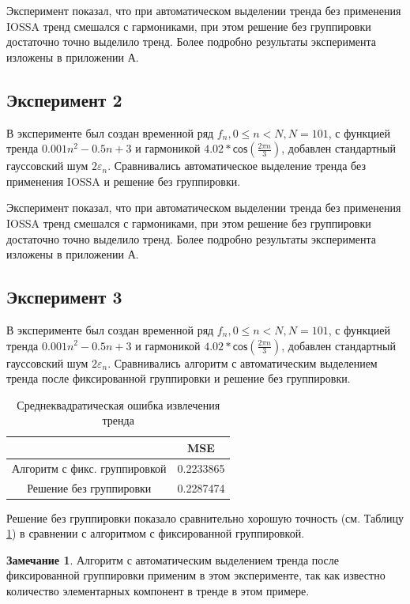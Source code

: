 \documentclass[specialist,
               substylefile = spbu_report.rtx,
               subf,href,colorlinks=true, 12pt]{disser}
\theoremstyle{definition}
\newtheorem{remark}{Замечание}
\begin{document}
Эксперимент показал, что при автоматическом выделении тренда без применения IOSSA тренд смешался с гармониками, при этом решение без группировки достаточно точно выделило тренд. Более подробно результаты эксперимента изложены в приложении А.

\subsection{Эксперимент 2}
В эксперименте был создан временной ряд $f_n , 0\leq n < N, N=101$, с функцией тренда $0.001n^2-0.5n+3$ и гармоникой $4.02 * \mathsf{cos}(\frac{2\pi n}{3})$, добавлен стандартный гауссовский шум $2 \varepsilon_n$.
Сравнивались автоматическое выделение тренда без применения IOSSA и решение без группировки.

Эксперимент показал, что при автоматическом выделении тренда без применения IOSSA тренд смешался с гармониками, при этом решение без группировки достаточно точно выделило тренд. Более подробно результаты эксперимента изложены в приложении А.

\subsection{Эксперимент 3}
В эксперименте был создан временной ряд $f_n , 0\leq n < N, N=101$, с функцией тренда $0.001n^2-0.5n+3$ и гармоникой $4.02 * \mathsf{cos}(\frac{2\pi n}{3})$, добавлен стандартный гауссовский шум $2 \varepsilon_n$.
Сравнивались алгоритм с автоматическим выделением тренда после фиксированной группировки и решение без группировки.

\begin{table}[h]
\caption{Среднеквадратическая ошибка извлечения тренда}
\label{tabular:1}
\begin{center}
\begin{tabular}{|c | c|}
\hline
 & MSE \\
\hline
Алгоритм с фикс. группировкой &  0.2233865\\
Решение без группировки & 0.2287474 \\
\hline
\end{tabular}
\end{center}
\end{table}
Решение без группировки показало сравнительно хорошую точность (см. Таблицу \ref{tabular:1}) в сравнении с алгоритмом с фиксированной группировкой.

\begin{remark}
    Алгоритм с автоматическим выделением тренда после фиксированной группировки применим в этом эксперименте, так как известно количество элементарных компонент в тренде в этом примере.
\end{remark}
\end{document}
